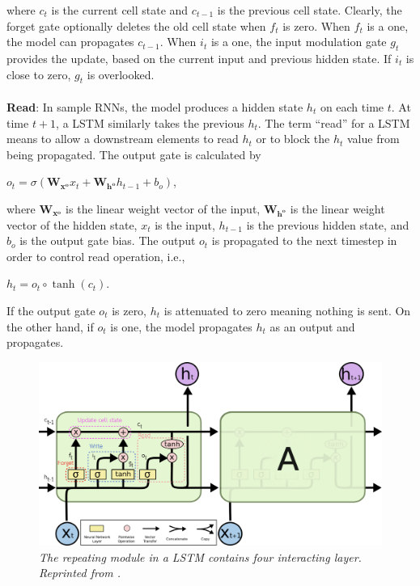 where $c_t$ is the current cell state and $c_{t-1}$ is the previous cell state. Clearly, the forget gate optionally deletes the old cell state when $f_t$ is zero. When $f_t$ is a one, the model can propagates $c_{t -1}$. When $i_t$ is a one, the input modulation gate $g_t$ provides the update, based on the current input and previous hidden state. If $i_t$ is close to zero, $g_t$ is overlooked.

\paragraph{}
\textbf{Read}: In sample RNNs, the model produces a hidden state $h_t$ on each time $t$. At  time $t+1$, a LSTM similarly takes the previous $h_t$. The term “read” for a LSTM means to allow a downstream elements to read $h_t$ or to block the $h_t$ value from being propagated. The output gate is calculated by

\hfil $ o_t = \sigma(\mathbf{W_{x^o}}x_t + \mathbf{W_{h^o}}h_{t-1} + b_o) $, \par 

where $\mathbf{W_{x^o}}$ is the linear weight vector of the input, $\mathbf{W_{h^o}}$ is the linear weight vector of the hidden state, $x_t$ is the input, $h_{t-1}$ is the previous hidden state, and $b_o$ is the output gate bias. The output $o_t$ is propagated to the next timestep in order to control read operation, i.e.,

\hfil $ h_t = o_t \circ \tanh(c_t) $. \par 
If the output gate $o_t$ is zero, $h_t$ is attenuated to zero meaning nothing is sent. On the other hand, if $o_t$ is one, the model propagates $h_t$ as an output and propagates.

\begin{figure}[H]
  \centering
  \caption[The repeating module in a LSTM contains four interacting layer.]{\emph{The repeating module in a LSTM contains four interacting layer. \\Reprinted from \citeauthor{olah_2015} \citeyear{olah_2015}.}}\label{fig:LSTM_2}
  \includegraphics[scale = 0.14]{figures/LSTM_2.jpg}  

\end{figure}

